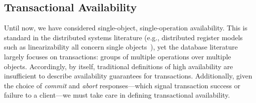 



\subsection{Transactional Availability}

Until now, we have considered single-object, single-operation
availability. This is standard in the distributed systems literature
(e.g., distributed register models such as linearizability all concern
single objects~\cite{herlihy-art}), yet the database literature
largely focuses on transactions: groups of multiple operations over
multiple objects. Accordingly, by itself, traditional definitions of
high availability are insufficient to describe availability guarantees
for transactions. Additionally, given the choice of \textit{commit}
and \textit{abort} responses---which signal transaction success or
failure to a client---we must take care in defining transactional
availability.

